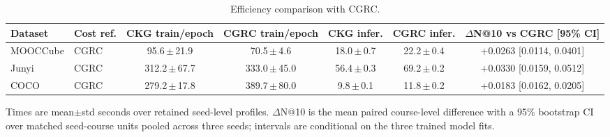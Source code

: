 \begin{table}[t]
\centering
{
\small
\setlength{\tabcolsep}{2.4pt}
\renewcommand{\arraystretch}{1.02}
\begin{tabular*}{\textwidth}{@{\extracolsep{\fill}}llccccc}
\toprule
Dataset & Cost ref. & CKG train/epoch & CGRC train/epoch & CKG infer. & CGRC infer. & \(\Delta\)N@10 vs CGRC [95\% CI] \\
\midrule
MOOCCube & CGRC & 95.6\,$\pm$\,21.9 & 70.5\,$\pm$\,4.6 & 18.0\,$\pm$\,0.7 & 22.2\,$\pm$\,0.4 & +0.0263 [0.0114, 0.0401] \\
Junyi & CGRC & 312.2\,$\pm$\,67.7 & 333.0\,$\pm$\,45.0 & 56.4\,$\pm$\,0.3 & 69.2\,$\pm$\,0.2 & +0.0330 [0.0159, 0.0512] \\
COCO & CGRC & 279.2\,$\pm$\,17.8 & 389.7\,$\pm$\,80.0 & 9.8\,$\pm$\,0.1 & 11.8\,$\pm$\,0.2 & +0.0183 [0.0162, 0.0205] \\
\bottomrule
\end{tabular*}
}
\caption{Efficiency comparison with CGRC.}
\label{tab:efficiency-aaai}
\vspace{2pt}
\parbox{\textwidth}{\footnotesize Times are mean\(\pm\)std seconds over retained seed-level profiles. \(\Delta\)N@10 is the mean paired course-level difference with a 95\% bootstrap CI over matched seed-course units pooled across three seeds; intervals are conditional on the three trained model fits.}
\end{table}
